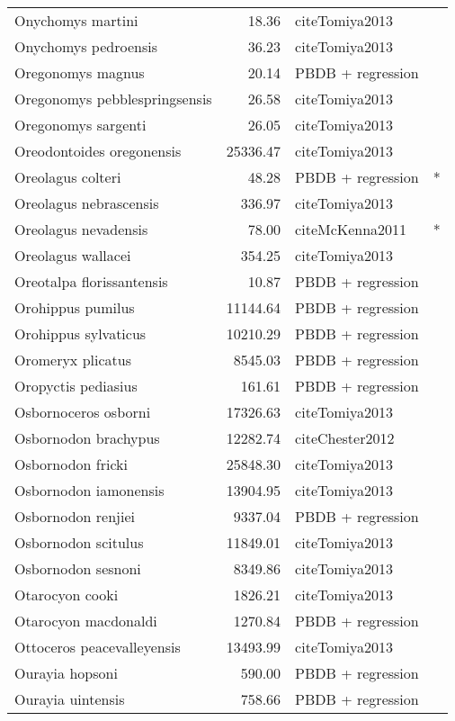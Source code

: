 \begin{table}[ht]
\begin{tabular}{lrll}
  Onychomys martini & 18.36 & cite{Tomiya2013} &  \\ 
  Onychomys pedroensis & 36.23 & cite{Tomiya2013} &  \\ 
  Oregonomys magnus & 20.14 & PBDB + regression &  \\ 
  Oregonomys pebblespringsensis & 26.58 & cite{Tomiya2013} &  \\ 
  Oregonomys sargenti & 26.05 & cite{Tomiya2013} &  \\ 
  Oreodontoides oregonensis & 25336.47 & cite{Tomiya2013} &  \\ 
  Oreolagus colteri & 48.28 & PBDB + regression & * \\ 
  Oreolagus nebrascensis & 336.97 & cite{Tomiya2013} &  \\ 
  Oreolagus nevadensis & 78.00 & cite{McKenna2011} & * \\ 
  Oreolagus wallacei & 354.25 & cite{Tomiya2013} &  \\ 
  Oreotalpa florissantensis & 10.87 & PBDB + regression &  \\ 
  Orohippus pumilus & 11144.64 & PBDB + regression &  \\ 
  Orohippus sylvaticus & 10210.29 & PBDB + regression &  \\ 
  Oromeryx plicatus & 8545.03 & PBDB + regression &  \\ 
  Oropyctis pediasius & 161.61 & PBDB + regression &  \\ 
  Osbornoceros osborni & 17326.63 & cite{Tomiya2013} &  \\ 
  Osbornodon brachypus & 12282.74 & cite{Chester2012} &  \\ 
  Osbornodon fricki & 25848.30 & cite{Tomiya2013} &  \\ 
  Osbornodon iamonensis & 13904.95 & cite{Tomiya2013} &  \\ 
  Osbornodon renjiei & 9337.04 & PBDB + regression &  \\ 
  Osbornodon scitulus & 11849.01 & cite{Tomiya2013} &  \\ 
  Osbornodon sesnoni & 8349.86 & cite{Tomiya2013} &  \\ 
  Otarocyon cooki & 1826.21 & cite{Tomiya2013} &  \\ 
  Otarocyon macdonaldi & 1270.84 & PBDB + regression &  \\ 
  Ottoceros peacevalleyensis & 13493.99 & cite{Tomiya2013} &  \\ 
  Ourayia hopsoni & 590.00 & PBDB + regression &  \\ 
  Ourayia uintensis & 758.66 & PBDB + regression &  \\ 

\end{tabular}
\end{table}
